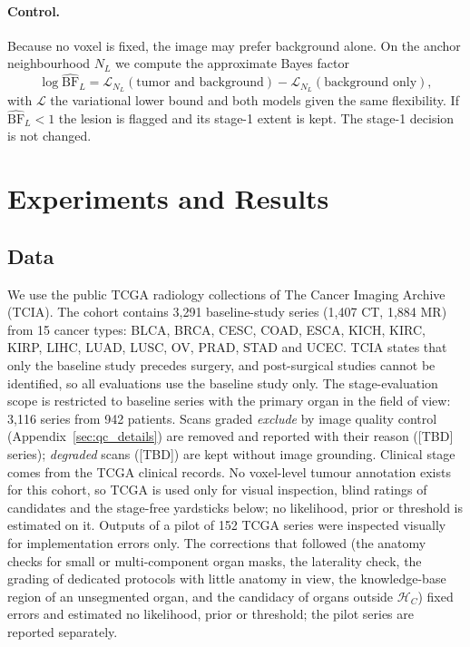 \documentclass[fleqn,10pt]{olplainarticle}
\begin{document}
\paragraph{Control.} Because no voxel is fixed, the image may prefer background alone. On the anchor neighbourhood $N_L$
we compute the approximate Bayes factor
\begin{equation}
\label{eq:stage2_bf}
\log\widehat{\mathrm{BF}}_L=\mathcal{L}_{N_L}(\text{tumor and background})-\mathcal{L}_{N_L}(\text{background only}),
\end{equation}
with $\mathcal{L}$ the variational lower bound and both models given the same flexibility. If $\widehat{\mathrm{BF}}_L<1$
the lesion is flagged and its stage-1 extent is kept. The stage-1 decision is not changed.

\section{Experiments and Results}
\label{sec:results}

\subsection{Data}
We use the public TCGA radiology collections of The Cancer Imaging Archive (TCIA). The cohort contains 3{,}291
baseline-study series (1{,}407 CT, 1{,}884 MR) from 15 cancer types: BLCA, BRCA, CESC, COAD, ESCA, KICH, KIRC, KIRP,
LIHC, LUAD, LUSC, OV, PRAD, STAD and UCEC. TCIA states that only the baseline study precedes surgery, and post-surgical
studies cannot be identified, so all evaluations use the baseline study only. The stage-evaluation scope is restricted
to baseline series with the primary organ in the field of view: 3{,}116 series from 942 patients. Scans graded \emph{exclude} by image quality control (Appendix~\ref{sec:qc_details}) are removed and reported with their reason ([TBD] series); \emph{degraded} scans ([TBD]) are kept without image grounding. Clinical stage comes
from the TCGA clinical records. No voxel-level tumour annotation exists for this cohort, so TCGA is used only for visual
inspection, blind ratings of candidates and the stage-free yardsticks below; no likelihood, prior or threshold is estimated
on it. Outputs of a pilot of 152 TCGA series were inspected visually for implementation errors only. The corrections that
followed (the anatomy checks for small or multi-component organ masks, the laterality check, the grading of dedicated
protocols with little anatomy in view, the knowledge-base region of an unsegmented organ, and the candidacy of organs
outside $\mathcal{H}_C$) fixed errors and estimated no likelihood, prior or threshold; the pilot series are reported
separately.
\end{document}
